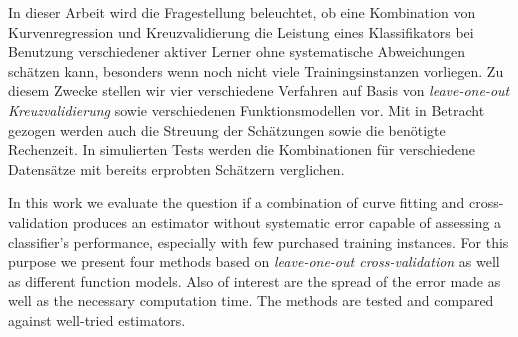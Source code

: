 
In dieser Arbeit wird die Fragestellung beleuchtet, ob eine Kombination von Kurvenregression und Kreuzvalidierung die Leistung eines Klassifikators bei Benutzung verschiedener aktiver Lerner ohne systematische Abweichungen schätzen kann, besonders wenn noch nicht viele Trainingsinstanzen vorliegen. Zu diesem Zwecke stellen wir vier verschiedene Verfahren auf Basis von \textit{leave-one-out Kreuzvalidierung} sowie verschiedenen Funktionsmodellen vor. Mit in Betracht gezogen werden auch die Streuung der Schätzungen sowie die benötigte Rechenzeit. In simulierten Tests werden die Kombinationen für verschiedene Datensätze mit bereits erprobten Schätzern verglichen.

In this work we evaluate the question if a combination of curve fitting and cross-validation produces an estimator without systematic error capable of assessing a classifier's performance, especially with few purchased training instances. For this purpose we present four methods based on \textit{leave-one-out cross-validation} as well as different function models. Also of interest are the spread of the error made as well as the necessary computation time. The methods are tested and compared against well-tried estimators.